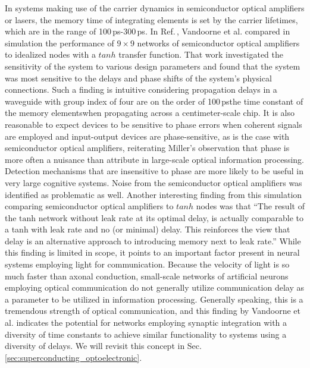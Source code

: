 In systems making use of the carrier dynamics in semiconductor optical amplifiers or lasers, the memory time of integrating elements is set by the carrier lifetimes, which are in the range of 100\,ps-300\,ps. In Ref.\,\cite{vada2011}, Vandoorne et al. compared in simulation the performance of $9\times 9$ networks of semiconductor optical amplifiers to idealized nodes with a $tanh$ transfer function. That work investigated the sensitivity of the system to various design parameters and found that the system was most sensitive to the delays and phase shifts of the system's physical connections. Such a finding is intuitive considering propagation delays in a waveguide with group index of four are on the order of 100\,ps\textemdash the time constant of the memory elements\textemdash when propagating across a centimeter-scale chip. It is also reasonable to expect devices to be sensitive to phase errors when coherent signals are employed and input-output devices are phase-sensitive, as is the case with semiconductor optical amplifiers, reiterating Miller's observation that phase is more often a nuisance than attribute in large-scale optical information processing. Detection mechanisms that are insensitive to phase are more likely to be useful in very large cognitive systems. Noise from the semiconductor optical amplifiers was identified as problematic as well. Another interesting finding from this simulation comparing semiconductor optical amplifiers to $tanh$ nodes was that ``The result of the $\mathrm{tanh}$ network without leak rate at its optimal delay, is actually comparable to a tanh with leak rate and no (or minimal) delay. This reinforces the view that delay is an alternative approach to introducing memory next to leak rate.'' While this finding is limited in scope, it points to an important factor present in neural systems employing light for communication. Because the velocity of light is so much faster than axonal conduction, small-scale networks of artificial neurons employing optical communication do not generally utilize communication delay as a parameter to be utilized in information processing. Generally speaking, this is a tremendous strength of optical communication, and this finding by Vandoorne et al. indicates the potential for networks employing synaptic integration with a diversity of time constants to achieve similar functionality to systems using a diversity of delays. We will revisit this concept in Sec.\,\ref{sec:superconducting_optoelectronic}.

